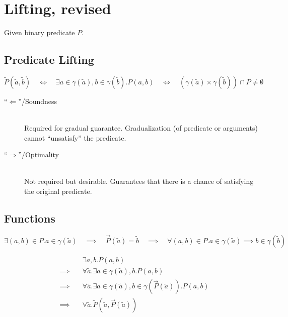 \documentclass[11pt,a4paper]{article}
\newcommand{\grad}[1]{\widetilde{#1}}
\begin{document}

\section{Lifting, revised}
Given binary predicate $P$.
\subsection{Predicate Lifting}
\begin{displaymath}
\grad{P}(\grad{a}, \grad{b}) 
\quad\iff\quad
\exists a \in \gamma(\grad{a}), b \in \gamma(\grad{b}). P(a, b)
\quad\iff\quad
(\gamma(\grad{a}) \times \gamma(\grad{b})) \cap P \neq \emptyset
\end{displaymath}

\begin{description}
    \item[“$\Leftarrow$”/Soundness]~\\
    Required for gradual guarantee.
    Gradualization (of predicate or arguments) cannot “unsatisfy” the predicate.
    
    \item[“$\Rightarrow$”/Optimality]~\\
    Not required but desirable. Guarantees that there is a chance of satisfying the original predicate.
\end{description}

\subsection{Functions}
\begin{displaymath}
\exists (a, b) \in P. a \in \gamma(\grad{a})
\quad\implies\quad
\vec{P}(\grad{a}) = \grad{b}
\quad\implies\quad
\forall (a, b) \in P. a \in \gamma(\grad{a}) \implies b \in \gamma(\grad{b})
\end{displaymath}

\begin{align*}
&\exists a, b. P(a, b) \\
\quad\implies\quad
&\forall \grad{a}. \exists a \in \gamma(\grad{a}), b. P(a, b) \\
\quad\implies\quad
&\forall \grad{a}. \exists a \in \gamma(\grad{a}), b \in \gamma(\vec{P}(\grad{a})). P(a, b) \\
\quad\implies\quad
&\forall \grad{a}. \grad{P}(\grad{a}, \vec{P}(\grad{a})) \\
\end{align*}
\end{document}

